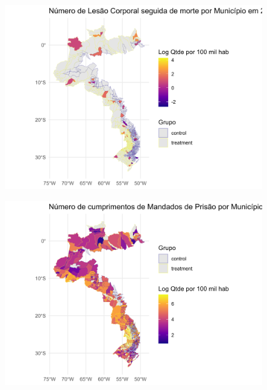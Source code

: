 \documentclass{beamer}
\begin{document}
\begin{frame}
	\begin{figure}
		\centering
		\includegraphics[width=1\linewidth]{figures/mapa_lesao}
		\label{fig:histoghom}
	\end{figure}
\end{frame}

\begin{frame}
	\begin{figure}
		\centering
		\includegraphics[width=1\linewidth]{figures/mapa_mandados}
		\label{fig:histoghom}
	\end{figure}
\end{frame}
\end{document}
